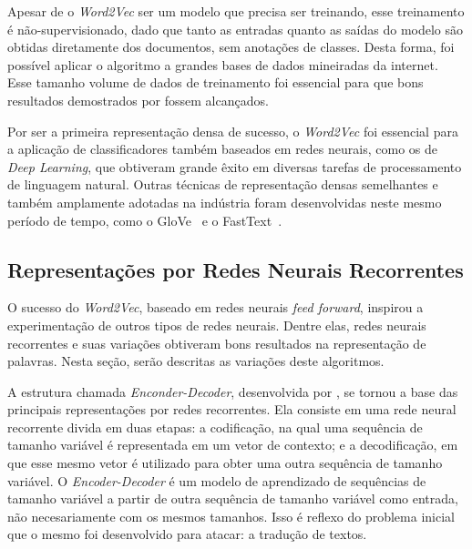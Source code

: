 Apesar de o \textit{Word2Vec} ser um modelo que precisa ser treinando, esse
treinamento é não-supervisionado, dado que tanto as entradas quanto as saídas do
modelo são obtidas diretamente dos documentos, sem anotações de classes.
Desta forma, foi possível aplicar o algoritmo a grandes bases de dados
mineiradas da internet.
Esse tamanho volume de dados de treinamento foi essencial para que bons resultados
demostrados por \citet{mikolov13} fossem alcançados.

Por ser a primeira representação densa de sucesso, o \textit{Word2Vec} foi
essencial para a aplicação de classificadores também baseados em redes neurais,
como os de \textit{Deep Learning}, que obtiveram grande êxito em diversas
tarefas de processamento de linguagem natural.
Outras técnicas de representação densas semelhantes e também amplamente adotadas
na indústria foram desenvolvidas neste mesmo período de tempo, como o
GloVe~\cite{pennington14} e o FastText~\cite{bojanowski17}.


\subsection{Representações por Redes Neurais Recorrentes}
\label{representation:rnn}

O sucesso do \textit{Word2Vec}, baseado em redes neurais \textit{feed forward},
inspirou a experimentação de outros tipos de redes neurais.
Dentre elas, redes neurais recorrentes e suas variações obtiveram bons resultados
na representação de palavras.
Nesta seção, serão descritas as variações deste algoritmos.

A estrutura chamada \textit{Enconder-Decoder}, desenvolvida por \citet{cho14},
se tornou a base das principais representações por redes recorrentes.
Ela consiste em uma rede neural recorrente divida em duas etapas: a codificação,
na qual uma sequência de tamanho variável é representada em um
vetor de contexto; e a decodificação, em que esse mesmo vetor é utilizado para
obter uma outra sequência de tamanho variável.
O \textit{Encoder-Decoder} é um modelo de aprendizado de sequências de tamanho
variável a partir de outra sequência de tamanho variável como entrada, não
necesariamente com os mesmos tamanhos.
Isso é reflexo do problema inicial que o mesmo foi desenvolvido para atacar: a
tradução de textos.

